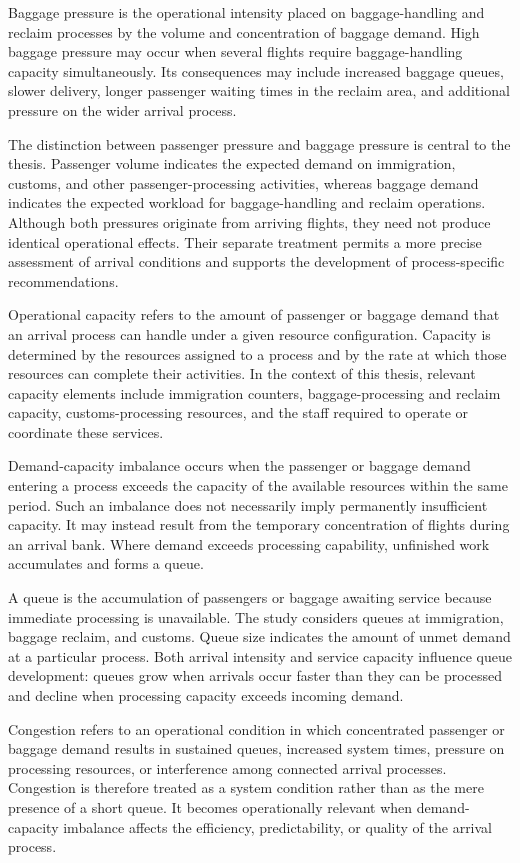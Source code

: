 Baggage pressure is the operational intensity placed on baggage-handling and reclaim processes by the volume and concentration of baggage demand. High baggage pressure may occur when several flights require baggage-handling capacity simultaneously. Its consequences may include increased baggage queues, slower delivery, longer passenger waiting times in the reclaim area, and additional pressure on the wider arrival process.

The distinction between passenger pressure and baggage pressure is central to the thesis. Passenger volume indicates the expected demand on immigration, customs, and other passenger-processing activities, whereas baggage demand indicates the expected workload for baggage-handling and reclaim operations. Although both pressures originate from arriving flights, they need not produce identical operational effects. Their separate treatment permits a more precise assessment of arrival conditions and supports the development of process-specific recommendations.

Operational capacity refers to the amount of passenger or baggage demand that an arrival process can handle under a given resource configuration. Capacity is determined by the resources assigned to a process and by the rate at which those resources can complete their activities. In the context of this thesis, relevant capacity elements include immigration counters, baggage-processing and reclaim capacity, customs-processing resources, and the staff required to operate or coordinate these services.

Demand-capacity imbalance occurs when the passenger or baggage demand entering a process exceeds the capacity of the available resources within the same period. Such an imbalance does not necessarily imply permanently insufficient capacity. It may instead result from the temporary concentration of flights during an arrival bank. Where demand exceeds processing capability, unfinished work accumulates and forms a queue.

A queue is the accumulation of passengers or baggage awaiting service because immediate processing is unavailable. The study considers queues at immigration, baggage reclaim, and customs. Queue size indicates the amount of unmet demand at a particular process. Both arrival intensity and service capacity influence queue development: queues grow when arrivals occur faster than they can be processed and decline when processing capacity exceeds incoming demand.

Congestion refers to an operational condition in which concentrated passenger or baggage demand results in sustained queues, increased system times, pressure on processing resources, or interference among connected arrival processes. Congestion is therefore treated as a system condition rather than as the mere presence of a short queue. It becomes operationally relevant when demand-capacity imbalance affects the efficiency, predictability, or quality of the arrival process.

